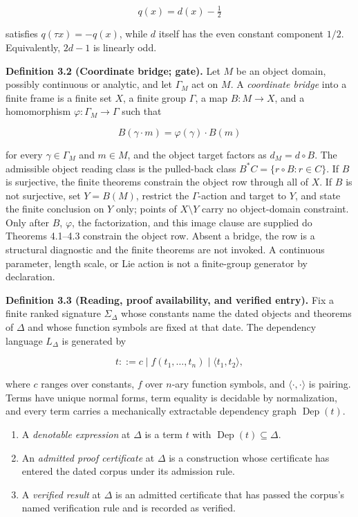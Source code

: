 \documentclass[10pt,twocolumn]{article}
\providecommand{\tightlist}{\setlength{\itemsep}{0pt}\setlength{\parskip}{0pt}}
\begin{document}
\[q(x) = d(x) - \tfrac{1}{2}\]

satisfies \(q(\tau x) = -q(x)\), while \(d\) itself has the even
constant component \(1/2\). Equivalently, \(2d - 1\) is linearly odd.

\textbf{Definition 3.2 (Coordinate bridge; gate).} Let \(M\) be an
object domain, possibly continuous or analytic, and let \(\Gamma_M\) act
on \(M\). A \emph{coordinate bridge} into a finite frame is a finite set
\(X\), a finite group \(\Gamma\), a map \(B : M \to X\), and a
homomorphism \(\varphi : \Gamma_M \to \Gamma\) such that

\[B(\gamma \cdot m) = \varphi(\gamma) \cdot B(m)\]

for every \(\gamma \in \Gamma_M\) and \(m \in M\), and the object target
factors as \(d_M = d \circ B\). The admissible object reading class is
the pulled-back class \(B^* C = \{ r \circ B : r \in C \}\). If \(B\) is
surjective, the finite theorems constrain the object row through all of
\(X\). If \(B\) is not surjective, set \(Y = B(M)\), restrict the
\(\Gamma\)-action and target to \(Y\), and state the finite conclusion
on \(Y\) only; points of \(X \setminus Y\) carry no object-domain
constraint. Only after \(B\), \(\varphi\), the factorization, and this
image clause are supplied do Theorems 4.1--4.3 constrain the object row.
Absent a bridge, the row is a structural diagnostic and the finite
theorems are not invoked. A continuous parameter, length scale, or Lie
action is not a finite-group generator by declaration.

\textbf{Definition 3.3 (Reading, proof availability, and verified
entry).} Fix a finite ranked signature \(\Sigma_\Delta\) whose constants
name the dated objects and theorems of \(\Delta\) and whose function
symbols are fixed at that date. The dependency language \(L_\Delta\) is
generated by

\[t ::= c \mid f(t_1, \dots, t_n) \mid \langle t_1, t_2 \rangle,\]

where \(c\) ranges over constants, \(f\) over \(n\)-ary function
symbols, and \(\langle \cdot, \cdot \rangle\) is pairing. Terms have
unique normal forms, term equality is decidable by normalization, and
every term carries a mechanically extractable dependency graph
\(\operatorname{Dep}(t)\).

\begin{enumerate}
\def\labelenumi{\arabic{enumi}.}
\tightlist
\item
  A \emph{denotable expression} at \(\Delta\) is a term \(t\) with
  \(\operatorname{Dep}(t) \subseteq \Delta\).
\item
  An \emph{admitted proof certificate} at \(\Delta\) is a construction
  whose certificate has entered the dated corpus under its admission
  rule.
\item
  A \emph{verified result} at \(\Delta\) is an admitted certificate that
  has passed the corpus's named verification rule and is recorded as
  verified.
\end{enumerate}
\end{document}
